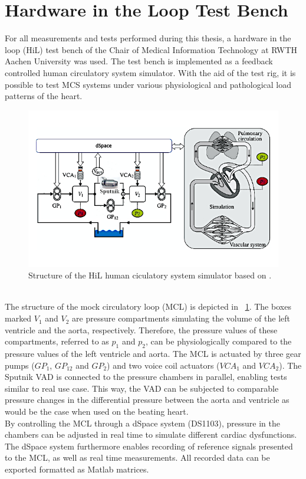 \section{Hardware in the Loop Test Bench}
For all measurements and tests performed during this thesis, a hardware in the loop (HiL) test bench of the Chair of Medical Information Technology at RWTH Aachen University was used. The test bench is implemented as a feedback controlled human circulatory system simulator. With the aid of the test rig, it is possible to test MCS systems under various physiological and pathological load patterns of the heart.
\begin{figure}[ht]
  \centering
  \includegraphics[width=\textwidth]{images/mock_loop.jpg}
  \caption[HiL test bench]{Structure of the HiL human ciculatory system simulator based on \cite{MCL}.}
  \label{fig:mock_loop}
\end{figure}
\\The structure of the mock circulatory loop (MCL) is depicted in \figurename~\ref{fig:mock_loop}. The boxes marked $V_{1}$ and $V_{2}$ are pressure compartments simulating the volume of the left ventricle and the aorta, respectively. Therefore, the pressure values of these compartments, referred to as $p_{1}$ and $p_{2}$, can be physiologically compared to the pressure values of the left ventricle and aorta. The MCL is actuated by three gear pumps ($GP_{1}$, $GP_{12}$ and $GP_{2}$) and two voice coil actuators ($VCA_{1}$ and $VCA_{2}$). The Sputnik VAD is connected to the pressure chambers in parallel, enabling tests similar to real use case. This way, the VAD can be subjected to comparable pressure changes in the differential pressure between the aorta and ventricle as would be the case when used on the beating heart.
\\By controlling the MCL through a dSpace system (DS1103), pressure in the chambers can be adjusted in real time to simulate different cardiac dysfunctions. The dSpace system furthermore enables recording of reference signals presented to the MCL, as well as real time measurements. All recorded data can be exported formatted as Matlab matrices.
